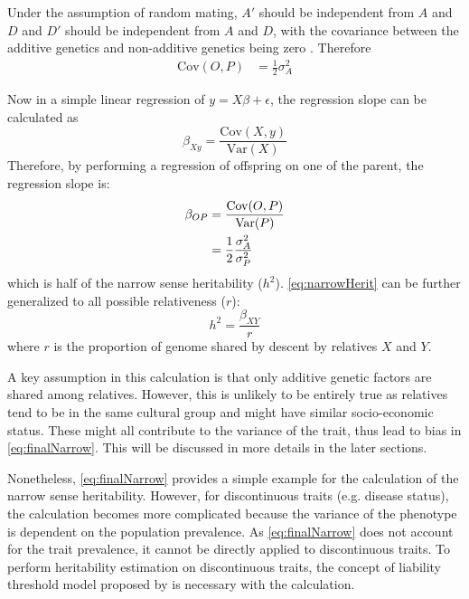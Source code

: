 \documentclass[12pt]{scrbook}
\begin{document}
Under the assumption of random mating,  $A'$ should be independent from $A$ and $D$ and $D'$ should be independent from $A$ and $D$, with the covariance between the additive genetics and non-additive genetics being zero \citep{Falconer1996}.
Therefore
\begin{align}
\mathrm{Cov}(O,P) &= \frac{1}{2}\sigma_A^2
\label{eq:covOP}
\end{align}

Now in a simple linear regression of $y=X\beta+\epsilon$, the regression slope can be calculated as
\begin{equation}
\beta_{Xy}=\frac{\mathrm{Cov}(X,y)}{\mathrm{Var}(X)}
\end{equation}
Therefore, by performing a regression of offspring on one of the parent, the regression slope is:
\begin{align}
\beta_{OP} &= \frac{\mathrm{Cov}(O,P)}{\mathrm{Var}(P)}\notag\\
&=\frac{1}{2}\frac{\sigma_A^2}{\sigma_P^2}
\label{eq:narrowHerit}
\end{align}
which is half of the narrow sense heritability ($h^2$).
\cref{eq:narrowHerit} can be further generalized to all possible relativeness ($r$):
\begin{equation}
h^2=\frac{\beta_{XY}}{r}
\label{eq:finalNarrow}
\end{equation}
where $r$ is the proportion of genome shared by descent by relatives $X$ and $Y$.

A key assumption in this calculation is that only additive genetic factors are shared among relatives.
However, this is unlikely to be entirely true as relatives tend to be in the same cultural group and might have similar socio-economic status.
These might all contribute to the variance of the trait, thus lead to bias in \cref{eq:finalNarrow}.
This will be discussed in more details in the later sections.
	
Nonetheless, \cref{eq:finalNarrow} provides a simple example for the calculation of the narrow sense heritability.
However, for discontinuous traits (e.g. disease status), the calculation becomes more complicated because the variance of the phenotype is dependent on the population prevalence.
As \cref{eq:finalNarrow} does not account for the trait prevalence, it cannot be directly applied to discontinuous traits.
To perform heritability estimation on discontinuous traits, the concept of liability threshold model proposed by \cite{Falconer1965} is necessary with the calculation.
\end{document}
